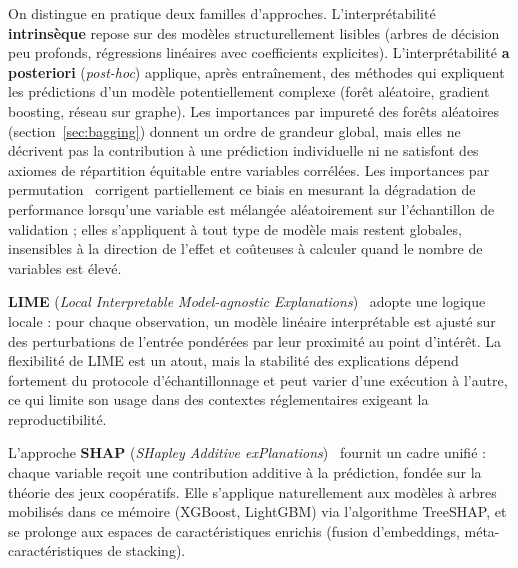 \label{sec:interpretabilite-enjeux}

On distingue en pratique deux familles d'approches.
L'interpr\'etabilit\'e \textbf{intrins\`eque} repose sur des mod\`eles structurellement lisibles (arbres de d\'ecision peu profonds, r\'egressions lin\'eaires avec coefficients explicites).
L'interpr\'etabilit\'e \textbf{a posteriori} (\emph{post-hoc}) applique, apr\`es entra\^inement, des m\'ethodes qui expliquent les pr\'edictions d'un mod\`ele potentiellement complexe (for\^et al\'eatoire, gradient boosting, r\'eseau sur graphe).
Les importances par impuret\'e des for\^ets al\'eatoires (section~\ref{sec:bagging}) donnent un ordre de grandeur global, mais elles ne d\'ecrivent pas la contribution \`a une pr\'ediction individuelle ni ne satisfont des axiomes de r\'epartition \'equitable entre variables corr\'el\'ees.
Les importances par permutation~\cite{breiman2001rf} corrigent partiellement ce biais en mesurant la d\'egradation de performance lorsqu'une variable est m\'elang\'ee al\'eatoirement sur l'\'echantillon de validation ; elles s'appliquent \`a tout type de mod\`ele mais restent globales, insensibles \`a la direction de l'effet et co\^uteuses \`a calculer quand le nombre de variables est \'elev\'e.

\textbf{LIME} (\emph{Local Interpretable Model-agnostic Explanations})~\cite{ribeiro2016lime} adopte une logique locale : pour chaque observation, un mod\`ele lin\'eaire interpr\'etable est ajust\'e sur des perturbations de l'entr\'ee pond\'er\'ees par leur proximit\'e au point d'int\'er\^et.
La flexibilit\'e de LIME est un atout, mais la stabilit\'e des explications d\'epend fortement du protocole d'\'echantillonnage et peut varier d'une ex\'ecution \`a l'autre, ce qui limite son usage dans des contextes r\'eglementaires exigeant la reproductibilit\'e.

L'approche \textbf{SHAP} (\emph{SHapley Additive exPlanations})~\cite{lundberg2017shap} fournit un cadre unifi\'e : chaque variable re\c{c}oit une contribution additive \`a la pr\'ediction, fond\'ee sur la th\'eorie des jeux coop\'eratifs.
Elle s'applique naturellement aux mod\`eles \`a arbres mobilis\'es dans ce m\'emoire (XGBoost, LightGBM) via l'algorithme TreeSHAP, et se prolonge aux espaces de caract\'eristiques enrichis (fusion d'embeddings, m\'eta-caract\'eristiques de stacking).


\label{sec:shapley-shap}

